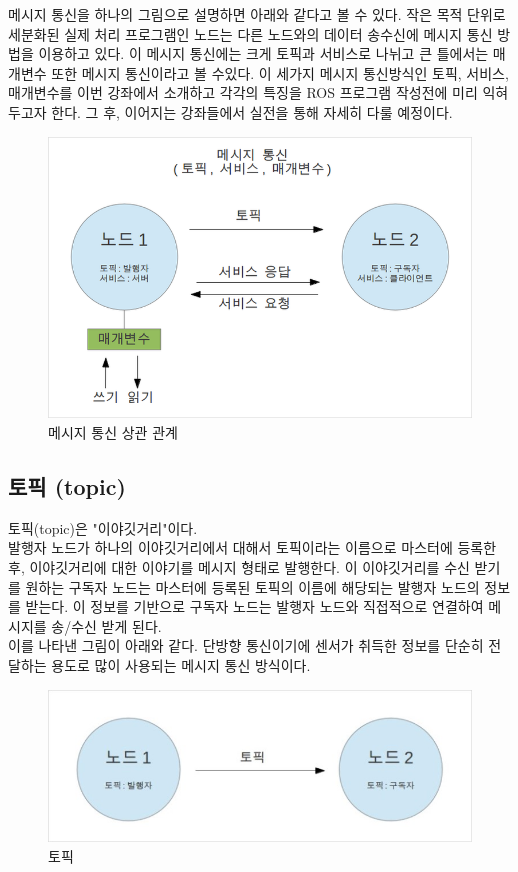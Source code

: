 메시지 통신을 하나의 그림으로 설명하면 아래와 같다고 볼 수 있다. 작은 목적 단위로 세분화된 실제 처리 프로그램인 노드는 다른 노드와의 데이터 송수신에 메시지 통신 방법을 이용하고 있다. 이 메시지 통신에는 크게 토픽과 서비스로 나뉘고 큰 틀에서는 매개변수 또한 메시지 통신이라고 볼 수있다. 이 세가지 메시지 통신방식인 토픽, 서비스, 매개변수를 이번 강좌에서 소개하고 각각의 특징을 ROS 프로그램 작성전에 미리 익혀두고자 한다. 그 후, 이어지는 강좌들에서 실전을 통해 자세히 다룰 예정이다.

\begin{figure}[h]
\centering\includegraphics[width=0.5\columnwidth]{pictures/chapter7/msgtrans1.png}
\caption{메시지 통신 상관 관계}
\end{figure}

\subsection{토픽 (topic)}

토픽(topic)은 "이야깃거리"이다.\\ 

발행자 노드가 하나의 이야깃거리에서 대해서 토픽이라는 이름으로 마스터에 등록한 후, 이야깃거리에 대한 이야기를 메시지 형태로 발행한다. 이 이야깃거리를 수신 받기를 원하는 구독자 노드는 마스터에 등록된 토픽의 이름에 해당되는 발행자 노드의 정보를 받는다. 이 정보를 기반으로 구독자 노드는 발행자 노드와 직접적으로 연결하여 메시지를 송/수신 받게 된다. \\

이를 나타낸 그림이 아래와 같다. 단방향 통신이기에 센서가 취득한 정보를 단순히 전달하는 용도로 많이 사용되는 메시지 통신 방식이다.

\begin{figure}[h]
\centering\includegraphics[width=0.5\columnwidth]{pictures/chapter7/msgtrans2.jpg}
\caption{토픽}
\end{figure}

